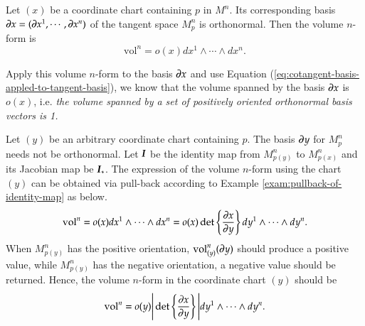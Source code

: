 \documentclass[11pt, a4paper]{book}
\begin{document}
\begin{Definition}
  \label{defi:volume-form}
  Let $(x)$ be a coordinate chart containing $p$ in $M^n$. Its corresponding basis
  $\boldsymbol{\partial}x = (\boldsymbol{\partial}x^1,\cdots,\boldsymbol{\partial}x^n)$ of the tangent space
  $M_p^n$ is orthonormal. Then the volume $n$-form is
  \begin{equation}
    \label{eq:volume-form}
    \mathrm{vol}^n = o(x) dx^1 \wedge \cdots \wedge dx^n.
  \end{equation}
\end{Definition} 
Apply this volume $n$-form to the basis $\boldsymbol{\partial}x$ and use Equation
(\ref{eq:cotangent-basis-appled-to-tangent-basis}), we know that the volume spanned by the
basis $\boldsymbol{\partial}x$ is $o(x)$, i.e. \emph{the volume spanned by a set of positively
  oriented orthonormal basis vectors is 1.}

Let $(y)$ be an arbitrary coordinate chart containing $p$. The basis $\boldsymbol{\partial}y$ for
$M_{p}^n$ needs not be orthonormal. Let $\boldsymbol{I}$ be the identity map from $M_{p(y)}^n$
to $M_{p(x)}^n$ and its Jacobian map be $\boldsymbol{I}_{*}$. The expression of the volume
$n$-form using the chart $(y)$ can be obtained via pull-back according to Example
\ref{exam:pullback-of-identity-map} as below.
\begin{equation*}
  \mathrm{vol}^n = o(x) dx^1 \wedge \cdots \wedge dx^n = o(x) \det \left\{  \frac{\partial x}{\partial
      y} \right\} dy^1 \wedge \cdots \wedge dy^n.
\end{equation*}
When $M_{p(y)}^n$ has the positive orientation, $\mathrm{vol}_{(y)}^n(\boldsymbol{\partial}y)$
should produce a positive value, while $M_{p(y)}^n$ has the negative orientation, a
negative value should be returned. Hence, the volume $n$-form in the coordinate chart
$(y)$ should be
\begin{equation}
  \label{eq:volume-form-in-y}
  \mathrm{vol}^n = o(y) \Bigg\vert\det \left\{ \frac{\partial x}{\partial y}
  \right\}\Bigg\vert dy^1 \wedge\cdots\wedge dy^n.
\end{equation}
\end{document}

